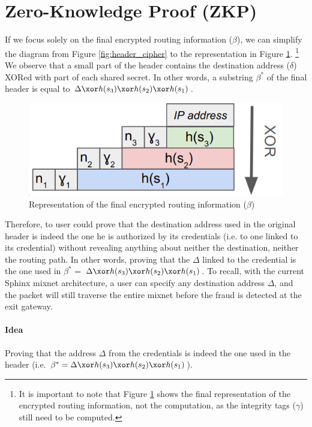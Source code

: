 \section{Zero-Knowledge Proof (ZKP)}

If we focus solely on the final encrypted routing information ($\beta$), we can simplify the diagram from Figure \ref{fig:header_cipher} to the representation in Figure \ref{fig:schema_final_header}.
\footnote{It is important to note that Figure \ref{fig:schema_final_header} shows the final representation of the encrypted routing information, not the computation, as the integrity tags ($\gamma$) still need to be computed.}
We observe that a small part of the header contains the destination address ($\delta$) XORed with part of each shared secret. 
In other words, a substring $\beta^*$ of the final header is equal to $\Delta \xor h(s_3) \xor h(s_2) \xor h(s_1)$.

\begin{figure}[H]
    \centering
    \includegraphics[width=0.5\linewidth]{Images/structure_final_header.png}
    \caption{Representation of the final encrypted routing information ($\beta$)}
    \label{fig:schema_final_header}
\end{figure}

Therefore, to user could prove that the destination address used in the original header is indeed the one he is authorized by its credentials (i.e. to one linked to its credential) without revealing anything about neither the destination, neither the routing path. 
In other words, proving that the $\Delta$ linked to the credential is the one used in $\beta^*$ = $\Delta \xor h(s_3) \xor h(s_2) \xor h(s_1)$.
To recall, with the current Sphinx mixnet architecture, a user can specify any destination address $\Delta$, and the packet will still traverse the entire mixnet before the fraud is detected at the exit gateway.

\paragraph{Idea} Proving that the address $\Delta$ from the credentials is indeed the one used in the header (i.e. $\beta^* = \Delta \xor h(s_3) \xor h(s_2) \xor h(s_1)$).

